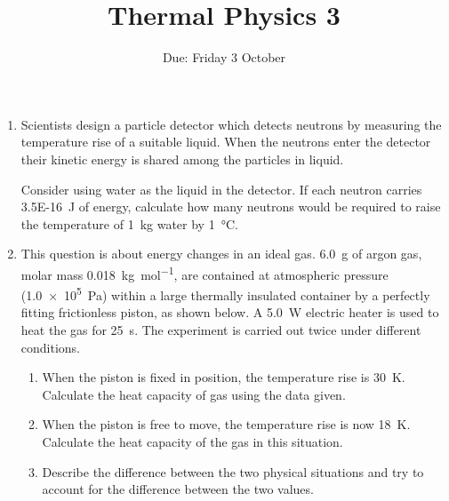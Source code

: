 \documentclass{article}
\title{Thermal Physics 3}
\date{Due: Friday 3 October}
\begin{document}
\maketitle\thispagestyle{empty}
\begin{enumerate}
    \item Scientists design a particle detector which detects neutrons by measuring the temperature rise of a suitable liquid. When the neutrons enter the detector their kinetic energy is shared among the particles in liquid. 

Consider using water as the liquid in the detector. If each neutron carries \SI{3.5E-16}{\joule} of energy, calculate how many neutrons would be required to raise the temperature of \SI{1}{\kg} water by \SI{1}{\celsius}.

    \item This question is about energy changes in an ideal gas. \SI{6.0}{\g} of argon gas, molar mass \SI{0.018}{\kilogram\per\mol}, are contained at atmospheric pressure (\SI{1.0e5}{\pascal}) within a large thermally insulated container by a perfectly fitting frictionless piston, as shown below. A \SI{5.0}{\watt} electric heater is used to heat the gas for \SI{25}{\s}. The experiment is carried out twice under different conditions.
        \begin{figure}[h]
            \centering
             \caption{}
        \end{figure}
        \begin{enumerate}
            \item When the piston is fixed in position, the temperature rise is \SI{30}{\K}. Calculate the heat capacity of gas using the data given.
            \item When the piston is free to move, the temperature rise is now \SI{18}{\K}. Calculate the heat capacity of the gas in this situation.
            \item Describe the difference between the two physical situations and try to account for the difference between the two values.
        \end{enumerate}

\end{enumerate}
\end{document}

